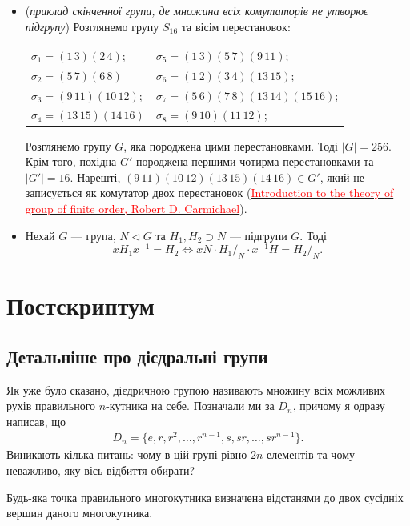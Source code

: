 \documentclass{math_library}
\begin{document}
\begin{itemize}[wide=0pt]
\item (\textit{приклад скінченної групи, де множина всіх комутаторів не утворює підгрупу}) Розглянемо групу $S_{16}$ та вісім перестановок:
\begin{center}
\begin{tabular}{ll}
$\sigma_1 = (1\,3)(2\,4)$; & $\sigma_5 = (1\,3)(5\,7)(9\,11)$; \\
$\sigma_2 = (5\,7)(6\,8)$ & $\sigma_6 = (1\,2)(3\,4)(13\,15)$; \\
$\sigma_3 = (9\,11)(10\,12)$; & $\sigma_7 = (5\,6)(7\,8)(13\,14)(15\,16)$; \\
$\sigma_4 = (13\,15)(14\,16)$ & $\sigma_8 = (9\,10)(11\,12)$; \\
\end{tabular}
\end{center}
Розглянемо групу $G$, яка породжена цими перестановками. Тоді $|G| = 256$. Крім того, похідна $G'$ породжена першими чотирма перестановками та $|G'| = 16$. Нарешті, $(9\,11)(10\,12)(13\,15)(14\,16) \in G'$, який не записується як комутатор двох перестановок (\href{https://absinthe.tuxfamily.org/openmathdep/algebra_abstract/Groups_of_Finite_Order-Carmichael.pdf}{\textcolor{red}{Introduction to the theory of group of finite order, Robert D. Carmichael}}).

\item Нехай $G$ --- група, $N \triangleleft G$ та $H_1,H_2 \supset N$ --- підгрупи $G$. Тоді 
\[
xH_1x^{-1} = H_2 \iff xN \cdot H_1/_N \cdot x^{-1}H = H_2/_N.
\]
\end{itemize}

\newpage
\section*{Постскриптум}
\subsection*{Детальніше про дієдральні групи}
Як уже було сказано, дієдричною групою називають множину всіх можливих рухів правильного $n$-кутника на себе. Позначали ми за $D_n$, причому я одразу написав, що
\begin{align*}
D_n = \{e,r,r^2,\dots,r^{n-1},s,sr,\dots,sr^{n-1}\}.
\end{align*}
Виникають кілька питань: чому в цій групі рівно $2n$ елементів та чому неважливо, яку вісь відбиття обирати?

\begin{lemma}
Будь-яка точка правильного многокутника визначена відстанями до двох сусідніх вершин даного многокутника.
\end{lemma}
\end{document}
